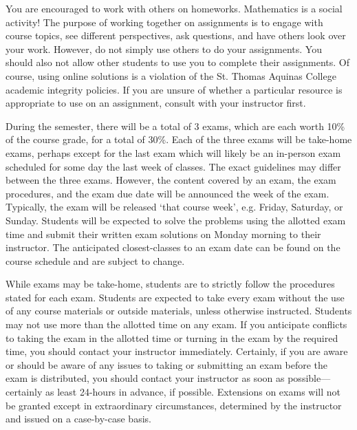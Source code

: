 \documentclass[11pt,letterpaper]{article}
\begin{document}
You are encouraged to work with others on homeworks. Mathematics is a social activity! The purpose of working together on assignments is to engage with course topics, see different perspectives, ask questions, and have others look over your work. However, do not simply use others to do your assignments. You should also not allow other students to use you to complete their assignments. Of course, using online solutions is a violation of the St. Thomas Aquinas College academic integrity policies. If you are unsure of whether a particular resource is appropriate to use on an assignment, consult with your instructor first. \sectionbreak



During the semester, there will be a total of 3 exams, which are each worth 10\% of the course grade, for a total of 30\%. Each of the three exams will be take-home exams, perhaps except for the last exam which will likely be an in-person exam scheduled for some day the last week of classes. The exact guidelines may differ between the three exams. However, the content covered by an exam, the exam procedures, and the exam due date will be announced the week of the exam. Typically, the exam will be released `that course week', e.g. Friday, Saturday, or Sunday. Students will be expected to solve the problems using the allotted exam time and submit their written exam solutions on Monday morning to their instructor. The anticipated closest-classes to an exam date can be found on the course schedule and are subject to change. \pspace

While exams may be take-home, students are to strictly follow the procedures stated for each exam. Students are expected to take every exam without the use of any course materials or outside materials, unless otherwise instructed. Students may not use more than the allotted time on any exam. If you anticipate conflicts to taking the exam in the allotted time or turning in the exam by the required time, you should contact your instructor immediately. Certainly, if you are aware or should be aware of any issues to taking or submitting an exam before the exam is distributed, you should contact your instructor as soon as possible---certainly as least 24-hours in advance, if possible. Extensions on exams will not be granted except in extraordinary circumstances, determined by the instructor and issued on a case-by-case basis. \sectionbreak
\end{document}
